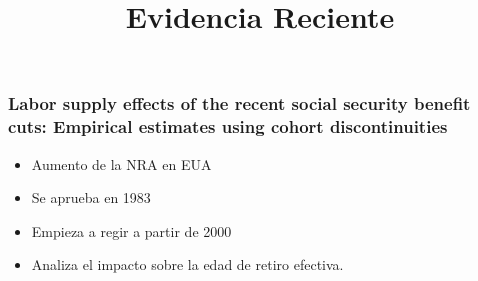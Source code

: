 \documentclass{beamer}
\title{Evidencia Reciente}
\begin{document}
\maketitle

\frame
{

  \frametitle{Labor supply effects of the recent social security benefit cuts: Empirical estimates using cohort discontinuities}
  
  \begin{itemize}
  \item Aumento de la NRA en EUA
  \item Se aprueba en 1983
  \item Empieza a regir a partir de 2000
  \item Analiza el impacto sobre la edad de retiro efectiva.
  \end{itemize}
}
\end{document}
